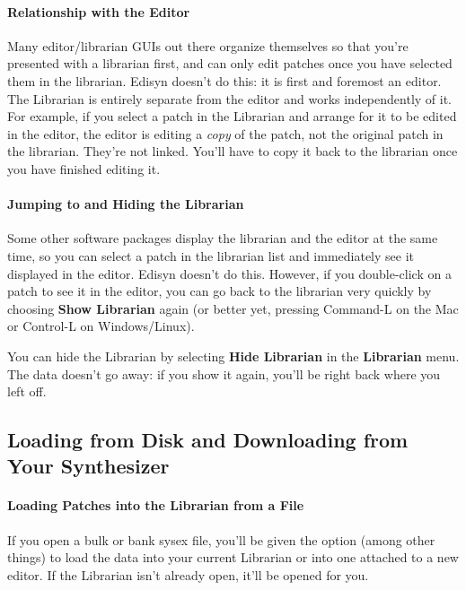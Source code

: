\documentclass{article}
\begin{document}
\paragraph{Relationship with the Editor} 

Many editor/librarian GUIs out there organize themselves so that you're presented with a librarian first, and can only edit patches once you have selected them in the librarian.  Edisyn doesn't do this: it is first and foremost an editor.  The Librarian is entirely separate from the editor and works independently of it.  For example, if you select a patch in the Librarian and arrange for it to be edited in the editor, the editor is editing a {\it copy} of the patch, not the original patch in the librarian. They're not linked.  You'll have to copy it back to the librarian once you have finished editing it.

\paragraph{Jumping to and Hiding the Librarian}
 
Some other software packages display the librarian and the editor at the same time, so you can select a patch in the librarian list and immediately see it displayed in the editor.  Edisyn doesn't do this.  However, if you double-click on a patch to see it in the editor, you can go back to the librarian very quickly by choosing {\bf Show Librarian} again (or better yet, pressing Command-L on the Mac or Control-L on Windows/Linux).

You can hide the Librarian by selecting {\bf Hide Librarian} in the {\bf Librarian} menu.  The data doesn't go away: if you show it again, you'll be right back where you left off.


\subsection{Loading from Disk and Downloading from Your Synthesizer} 

\paragraph{Loading Patches into the Librarian from a File}

If you open a bulk or bank sysex file, you'll be given the option (among other things) to load the data into your current Librarian or into one attached to a new editor.  If the Librarian isn't already open, it'll be opened for you.
\end{document}
